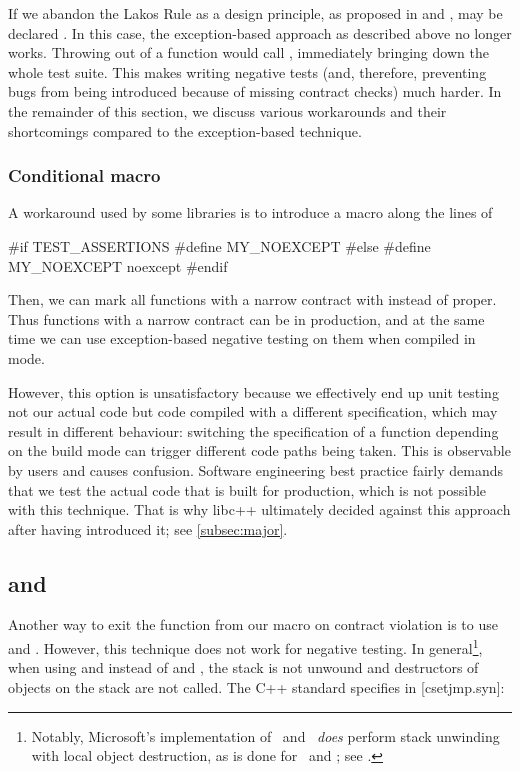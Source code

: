 If we abandon the Lakos Rule as a design principle, as proposed in \cite{P1656R2} and \cite{P2148R0},  may be declared . In this case, the exception-based approach as described above no longer works. Throwing  out of a  function would call , immediately bringing down the whole test suite. This makes writing negative tests (and, therefore, preventing bugs from being introduced because of missing contract checks) much harder. In the remainder of this section, we discuss various workarounds and their shortcomings compared to the exception-based technique.

\subsubsection{Conditional  macro}
\label{subsubsec:conditional}

A workaround used by some libraries is to introduce a macro along the lines of
\begin{codeblock}
#if TEST_ASSERTIONS
  #define MY_NOEXCEPT 
#else
  #define MY_NOEXCEPT noexcept
#endif
\end{codeblock}
Then, we can mark all functions with a narrow contract with  instead of  proper. Thus functions with a narrow contract can be  in production, and at the same time we can use exception-based negative testing on them when compiled in \mbox{} mode.

However, this option is  unsatisfactory because we effectively end up unit testing not our actual code but code compiled with a different specification, which may result in different behaviour: switching the  specification of a function depending on the build mode can trigger different code paths being taken. This is observable by users and causes confusion. Software engineering best practice fairly demands that we test the actual code that is built for production, which is not possible with this technique. That is why libc++ ultimately decided against this approach after having introduced it; see \ref{subsec:major}.

\subsection{ and }

Another way to exit the function from our  macro on contract violation is to use  and . However, this technique does not work for negative testing. In general\footnote{Notably, Microsoft's implementation of   and  \emph{does} perform stack unwinding with local object destruction, as is done for  and ; see \cite{MSVCDocLongjmp}.}, when using  and  instead of  and , the stack is not unwound and destructors of objects on the stack are not called. The C++ standard specifies in [csetjmp.syn]:

